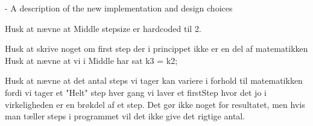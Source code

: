 - A description of the new implementation and design choices

Husk at nævne at Middle stepsize er hardcoded til 2.

Husk at skrive noget om first step der i princippet ikke er en del af matematikken \\

Husk at nævne at vi i Middle har sat k3 = k2;

Husk at nævne at det antal steps vi tager kan variere i forhold til matematikken fordi vi tager et "Helt" step hver gang vi laver et firstStep hvor det jo i virkeligheden er en brøkdel af et step. Det gør ikke noget for resultatet, men hvis man tæller steps i programmet vil det ikke give det rigtige antal.